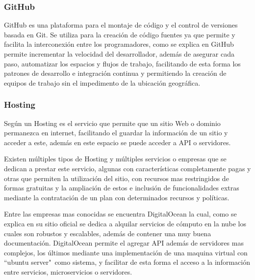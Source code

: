 \subsubsection{GitHub}
GitHub es una plataforma para el montaje de  código y el control de versiones
basada en Git. Se utiliza para la creación de código fuentes ya que permite y
facilita la interconexión entre los programadores, como se explica en \textcite{github}
 GitHub  permite incrementar la velocidad del desarrollador, además de asegurar
cada paso, automatizar los espacios y flujos de trabajo, facilitando de esta
forma los patrones de desarrollo e integración continua y permitiendo la creación
de equipos de trabajo sin el impedimento de la ubicación geográfica.

\subsubsection{Hosting}
Según \textcite{Hosting} un Hosting es el servicio que permite que un sitio
Web o dominio permanezca en internet, facilitando el guardar la información de un sitio
y acceder a este, además en este espacio se puede acceder a API o servidores.

Existen múltiples tipos de Hosting y múltiples servicios o empresas que se
dedican a prestar este servicio, algunas con características completamente pagas
y otras que permiten la utilización del sitio, con recursos mas restringidos de
formas gratuitas y la ampliación de estos e inclusión de funcionalidades extras
mediante la contratación de un plan con determinados recursos y políticas.

Entre las empresas mas conocidas se encuentra DigitalOcean  la cual, como se
explica en su sitio oficial \textcite{DigitalOcean} se dedica a alquilar servicios
de cómputo en la nube los cuales son robustos y escalables, además de contener
una muy buena documentación. DigitalOcean permite el agregar API además de
servidores mas complejos, los últimos mediante una implementación de una maquina
virtual con ``ubuntu server"\ como sistema, y facilitar de esta forma el acceso
a la información entre servicios, microservicios o servidores.
